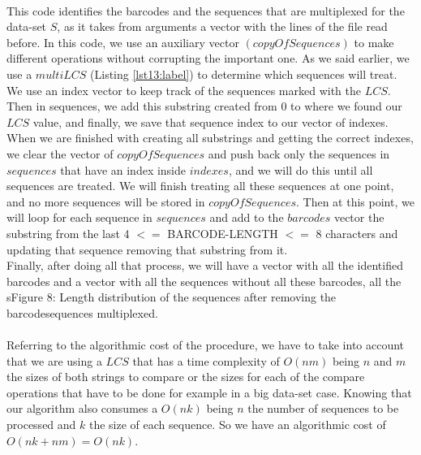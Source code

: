 \documentclass[a4paper,10pt]{article}
\begin{document}
\paragraph{} This code identifies the barcodes and the sequences that are multiplexed for the data-set $S$, as it takes from arguments a vector with the lines of the file read before.
In this code, we use an auxiliary vector $(copyOfSequences)$ to make different operations without corrupting the important one. As we said earlier, we use a $multiLCS$ (Listing \ref{lst13:label}) to determine which sequences will treat. We use an index vector to keep track of the sequences marked with the $LCS$. Then in sequences, we add this substring created from 0 to where we found our $LCS$ value, and finally, we save that sequence index to our vector of indexes. When we are finished with creating all substrings and getting the correct indexes, we clear the vector of $copyOfSequences$ and push back only the sequences in $sequences$ that have an index inside $indexes$, and we will do this until all sequences are treated. We will finish treating all these sequences at one point, and no more sequences will be stored in $copyOfSequences$. Then at this point, we will loop for each sequence in $sequences$ and add to the $barcodes$ vector the substring from the last 4 $<=$ BARCODE-LENGTH $<=$ 8 characters and updating that sequence removing that substring from it.\\
Finally, after doing all that process, we will have a vector with all the identified barcodes and a vector with all the sequences without all these barcodes, all the sFigure 8: Length distribution of the sequences after removing the barcodesequences multiplexed.

\vspace{5mm} %

\paragraph{} Referring to the algorithmic cost of the procedure, we have to take into account that we are using a $LCS$ that has a time complexity of $O(nm)$ being $n$ and $m$ the sizes of both strings to compare or the sizes for each of the compare operations that have to be done for example in a big data-set case. Knowing that our algorithm also consumes a $O(nk)$ being $n$ the number of sequences to be processed and $k$ the size of each sequence. So we have an algorithmic cost of $O(nk + nm) = O(nk)$.
\end{document}
